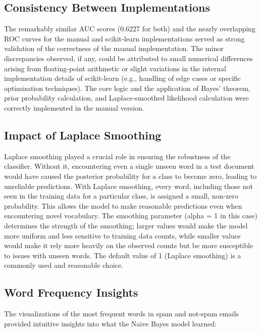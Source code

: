 \documentclass[12pt,letterpaper]{article}
\begin{document}
\subsection{Consistency Between Implementations}

The remarkably similar AUC scores (0.6227 for both) and the nearly overlapping ROC curves for the manual and scikit-learn implementations served as strong validation of the correctness of the manual implementation. The minor discrepancies observed, if any, could be attributed to small numerical differences arising from floating-point arithmetic or slight variations in the internal implementation details of scikit-learn (e.g., handling of edge cases or specific optimization techniques). The core logic and the application of Bayes' theorem, prior probability calculation, and Laplace-smoothed likelihood calculation were correctly implemented in the manual version.

\subsection{Impact of Laplace Smoothing}

Laplace smoothing played a crucial role in ensuring the robustness of the classifier. Without it, encountering even a single unseen word in a test document would have caused the posterior probability for a class to become zero, leading to unreliable predictions. With Laplace smoothing, every word, including those not seen in the training data for a particular class, is assigned a small, non-zero probability. This allows the model to make reasonable predictions even when encountering novel vocabulary. The smoothing parameter (alpha = 1 in this case) determines the strength of the smoothing; larger values would make the model more uniform and less sensitive to training data counts, while smaller values would make it rely more heavily on the observed counts but be more susceptible to issues with unseen words. The default value of 1 (Laplace smoothing) is a commonly used and reasonable choice.

\subsection{Word Frequency Insights}

The visualizations of the most frequent words in spam and not-spam emails provided intuitive insights into what the Naive Bayes model learned:
\end{document}

